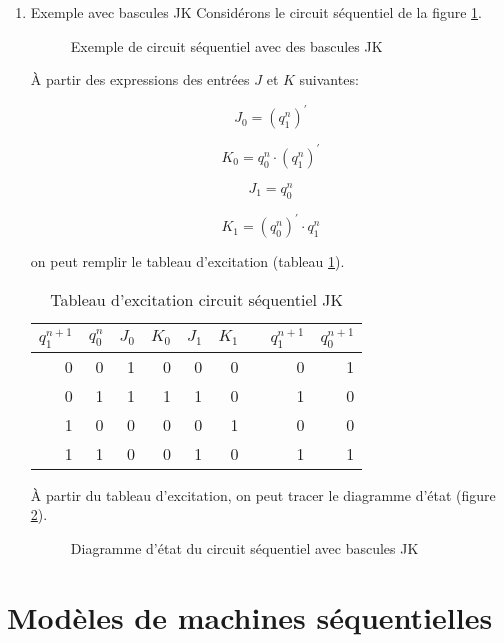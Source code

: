 \documentclass[letter, oneside]{book}
\begin{document}
\begin{enumerate}
\item Exemple avec bascules JK
\label{sec:orga191d6a}
Considérons le circuit séquentiel de la figure \ref{fig:org74326fe}.

\begin{figure}[htbp]
\centering

\caption{\label{fig:org74326fe}Exemple de circuit séquentiel avec des bascules JK}
\end{figure}

À partir des expressions des entrées \(J\) et \(K\) suivantes:

$$ J_0 = (q_1^{n})^\prime $$

$$ K_0 = q_0^{n} \cdot (q_1^{n})^\prime $$

$$ J_1 = q_0^{n} $$

$$ K_1 = (q_0^{n})^\prime \cdot q_1^{n} $$

on peut remplir le tableau d'excitation (tableau \ref{tab:org4a4c2af}).

\begin{table}[htbp]
\caption{\label{tab:org4a4c2af}Tableau d'excitation circuit séquentiel JK}
\centering
\begin{tabular}{rrrrrrlrr}
\(q_1^{n+1}\) & \(q_0^n\) & \(J_0\) & \(K_0\) & \(J_1\) & \(K_1\) &  & \(q_1^{n+1}\) & \(q_0^{n+1}\)\\[0pt]
\hline
0 & 0 & 1 & 0 & 0 & 0 &  & 0 & 1\\[0pt]
0 & 1 & 1 & 1 & 1 & 0 &  & 1 & 0\\[0pt]
1 & 0 & 0 & 0 & 0 & 1 &  & 0 & 0\\[0pt]
1 & 1 & 0 & 0 & 1 & 0 &  & 1 & 1\\[0pt]
\end{tabular}
\end{table}

À partir du tableau d'excitation, on peut tracer le diagramme d'état
(figure \ref{fig:org6bc38c4}).

\begin{figure}[htbp]
\centering

\caption{\label{fig:org6bc38c4}Diagramme d'état du circuit séquentiel avec bascules JK}
\end{figure}
\end{enumerate}

\section{Modèles de machines séquentielles}
\label{sec:org0a7c18e}
\end{document}
